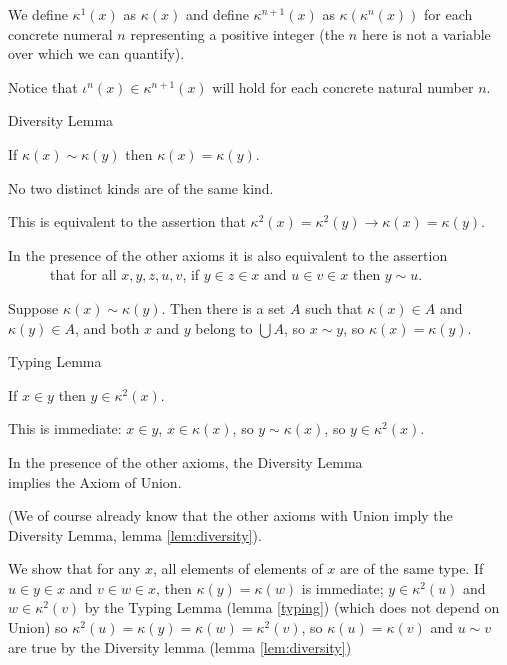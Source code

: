\documentclass[12pt]{article}
\begin{document}
\begin{dfn} We define $\kappa^1(x)$ as $\kappa(x)$ and define $\kappa^{n+1}(x)$ as $\kappa(\kappa^n(x))$ for each concrete numeral $n$ representing a positive integer (the $n$ here is not a variable over which we can quantify).\end{dfn}
Notice that $\iota^n(x) \in \kappa^{n+1}(x)$ will hold for each concrete natural number $n$.

\begin{lem}\label{lem:diversity}
  Diversity Lemma

  If $\kappa(x) \sim \kappa(y)$ then $\kappa(x)=\kappa(y)$.

  No two distinct kinds are of the same kind.

  This is equivalent to the assertion that $\kappa^2(x) = \kappa^2(y) \rightarrow \kappa(x)=\kappa(y)$.

  In the presence of the other axioms it is also equivalent 
  to the assertion\\ \mbox{\, \, \, \, } that for all $x,y,z,u,v$, if $y \in z \in x$ and $u \in v \in x$ then  $y \sim u$.\end{lem}

\Proof

Suppose $\kappa(x) \sim \kappa(y)$.  Then there is a set $A$ such
that $\kappa(x) \in A$ and $\kappa(y) \in A$, and both $x$ and $y$ belong to $\bigcup A$, so $x \sim y$, so $\kappa(x) = \kappa(y)$.   \endproof

\begin{lem}\label{typing} Typing Lemma

  If $x \in y$ then $y \in \kappa^2(x)$.  \end{lem} \Proof

This is immediate:  $x \in y$, $x \in \kappa(x)$, so $y  \sim \kappa(x)$, so $y \in \kappa^2(x)$.

\endproof



  \smallskip

 \begin{lem}

  In the presence of the other axioms, the Diversity Lemma\\ implies the Axiom of Union.  \end{lem}
  
  (We of course already know that the other axioms with Union imply the Diversity Lemma, lemma \ref{lem:diversity}).

\Proof  We show that for any $x$, all elements of elements of $x$ are of the same type.  If $u \in y \in x$ and $v \in w \in x$,  then $\kappa(y)=\kappa(w)$ is immediate;  $y \in \kappa^2(u)$
and $w \in \kappa^2(v)$ by the Typing Lemma (lemma \ref{typing}) (which does not depend on Union) so $\kappa^2(u) = \kappa(y) = \kappa(w) = \kappa^2(v)$, so $\kappa(u) = \kappa(v)$ and $u\sim v$ are true by the Diversity lemma (lemma \ref{lem:diversity})
\end{document}
